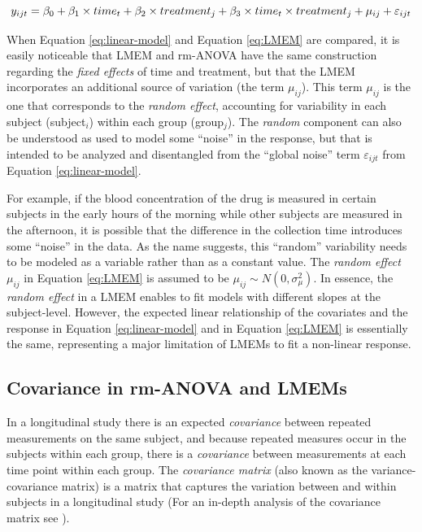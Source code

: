 \documentclass[Royal,times,doublespace,sagev]{sagej}
\begin{document}
\begin{equation}
y_{ijt} = \beta_0+ \beta_1 \times time_{t} + \beta_2 \times treatment_{j} + \beta_3 \times time_{t}\times treatment_{j}+\mu_{ij} +\varepsilon_{ijt}\\
\label{eq:LMEM}
\end{equation}

When Equation \eqref{eq:linear-model} and Equation \eqref{eq:LMEM} are compared, it is easily noticeable that LMEM and rm-ANOVA have the same construction regarding the \emph{fixed effects} of time and treatment, but that the LMEM incorporates an additional source of variation (the term \(\mu_{ij}\)). This term \(\mu_{ij}\) is the one that corresponds to the \emph{random effect}, accounting for variability in each subject (subject\(_i\)) within each group (group\(_j\)). The \emph{random} component can also be understood as used to model some ``noise'' in the response, but that is intended to be analyzed and disentangled from the ``global noise'' term \(\varepsilon_{ijt}\) from Equation \eqref{eq:linear-model}.

For example, if the blood concentration of the drug is measured in certain subjects in the early hours of the morning while other subjects are measured in the afternoon, it is possible that the difference in the collection time introduces some ``noise'' in the data. As the name suggests, this ``random'' variability needs to be modeled as a variable rather than as a constant value. The \emph{random effect} \(\mu_{ij}\) in Equation \eqref{eq:LMEM} is assumed to be \(\mu_{ij} \sim N(0,\sigma^2_\mu)\). In essence, the \emph{random effect} in a LMEM enables to fit models with different slopes at the subject-level\cite{pinheiro2006}. However, the expected linear relationship of the covariates and the response in Equation \eqref{eq:linear-model} and in Equation \eqref{eq:LMEM} is essentially the same, representing a major limitation of LMEMs to fit a non-linear response.

\hypertarget{covariance-in-rm-anova-and-lmems}{%
\subsection{Covariance in rm-ANOVA and LMEMs}\label{covariance-in-rm-anova-and-lmems}}

In a longitudinal study there is an expected \emph{covariance} between repeated measurements on the same subject, and because repeated measures occur in the subjects within each group, there is a \emph{covariance} between measurements at each time point within each group. The \emph{covariance matrix} (also known as the variance-covariance matrix) is a matrix that captures the variation between and within subjects in a longitudinal study\cite{wolfinger1996} (For an in-depth analysis of the covariance matrix see \cite{west2014, weiss2005}).
\end{document}
